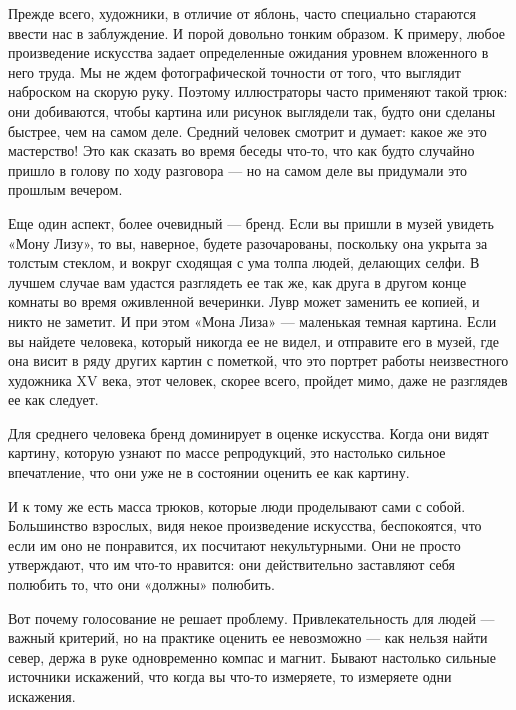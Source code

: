 \documentclass[ebook,12pt,oneside,openany]{memoir}
\begin{document}
Прежде всего, художники, в отличие от яблонь, часто специально
стараются ввести нас в заблуждение. И порой довольно тонким образом. К
примеру, любое произведение искусства задает определенные ожидания
уровнем вложенного в него труда. Мы не ждем фотографической точности
от того, что выглядит наброском на скорую руку. Поэтому иллюстраторы
часто применяют такой трюк: они добиваются, чтобы картина или рисунок
выглядели так, будто они сделаны быстрее, чем на самом деле. Средний
человек смотрит и думает: какое же это мастерство! Это как сказать во
время беседы что-то, что как будто случайно пришло в голову по ходу
разговора — но на самом деле вы придумали это прошлым вечером. \newline

Еще один аспект, более очевидный — бренд. Если вы пришли в музей
увидеть «Мону Лизу», то вы, наверное, будете разочарованы, поскольку
она укрыта за толстым стеклом, и вокруг сходящая с ума толпа людей,
делающих селфи. В лучшем случае вам удастся разглядеть ее так же, как
друга в другом конце комнаты во время оживленной вечеринки. Лувр может
заменить ее копией, и никто не заметит. И при этом «Мона Лиза» —
маленькая темная картина. Если вы найдете человека, который никогда ее
не видел, и отправите его в музей, где она висит в ряду других картин
с пометкой, что это портрет работы неизвестного художника XV века,
этот человек, скорее всего, пройдет мимо, даже не разглядев ее как
следует. \newline

Для среднего человека бренд доминирует в оценке искусства. Когда они
видят картину, которую узнают по массе репродукций, это настолько
сильное впечатление, что они уже не в состоянии оценить ее как
картину. \newline

И к тому же есть масса трюков, которые люди проделывают сами с собой.
Большинство взрослых, видя некое произведение искусства, беспокоятся,
что если им оно не понравится, их посчитают некультурными. Они не
просто утверждают, что им что-то нравится: они действительно
заставляют себя полюбить то, что они «должны» полюбить. \newline

Вот почему голосование не решает проблему. Привлекательность для людей
— важный критерий, но на практике оценить ее невозможно — как нельзя
найти север, держа в руке одновременно компас и магнит. Бывают
настолько сильные источники искажений, что когда вы что-то измеряете,
то измеряете одни искажения. \newline
\end{document}
